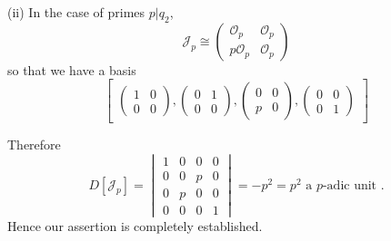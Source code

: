(ii) In the case of primes $p|q_2$,
$$
\mathcal{J}_p \cong 
\begin{pmatrix}
  \mathscr{O}_p & \mathscr{O}_p \\
  p\mathscr{O}_p & \mathscr{O}_p
\end{pmatrix}
$$
so that we have a basis
$$
\begin{bmatrix}
  \begin{pmatrix}
    1 & 0 \\0 & 0
  \end{pmatrix},
  
  \begin{pmatrix}
    0 & 1 \\0 & 0
  \end{pmatrix},
  
  \begin{pmatrix}
    0 & 0 \\p & 0 
  \end{pmatrix},
  
  \begin{pmatrix}
    0 & 0 \\ 0 & 1
  \end{pmatrix}
\end{bmatrix}
$$

Therefore
$$
D[\mathcal{J}_p] =
\begin{vmatrix}
  1 & 0 & 0 &0 \\
  0 & 0 & p &0 \\
  0 & p & 0 &0 \\
  0 & 0 &0 &1
\end{vmatrix}
=-p^2= p^2 \text{ a $p$-adic unit }.
$$
Hence our assertion is completely established.

